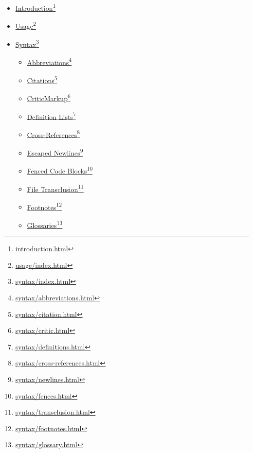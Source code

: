 \begin{itemize}
\item \href{introduction.html}{Introduction}\footnote{\href{introduction.html}{introduction.html}}

\item \href{usage/index.html}{Usage}\footnote{\href{usage/index.html}{usage\slash{}index.html}}

\item \href{syntax/index.html}{Syntax}\footnote{\href{syntax/index.html}{syntax\slash{}index.html}}

\begin{itemize}
\item \href{syntax/abbreviations.html}{Abbreviations}\footnote{\href{syntax/abbreviations.html}{syntax\slash{}abbreviations.html}}

\item \href{syntax/citation.html}{Citations}\footnote{\href{syntax/citation.html}{syntax\slash{}citation.html}}

\item \href{syntax/critic.html}{CriticMarkup}\footnote{\href{syntax/critic.html}{syntax\slash{}critic.html}}

\item \href{syntax/definitions.html}{Definition Lists}\footnote{\href{syntax/definitions.html}{syntax\slash{}definitions.html}}

\item \href{syntax/cross-references.html}{Cross-References}\footnote{\href{syntax/cross-references.html}{syntax\slash{}cross-references.html}}

\item \href{syntax/newlines.html}{Escaped Newlines}\footnote{\href{syntax/newlines.html}{syntax\slash{}newlines.html}}

\item \href{syntax/fences.html}{Fenced Code Blocks}\footnote{\href{syntax/fences.html}{syntax\slash{}fences.html}}

\item \href{syntax/transclusion.html}{File Transclusion}\footnote{\href{syntax/transclusion.html}{syntax\slash{}transclusion.html}}

\item \href{syntax/footnotes.html}{Footnotes}\footnote{\href{syntax/footnotes.html}{syntax\slash{}footnotes.html}}

\item \href{syntax/glossary.html}{Glossaries}\footnote{\href{syntax/glossary.html}{syntax\slash{}glossary.html}}


\end{itemize}
\end{itemize}
